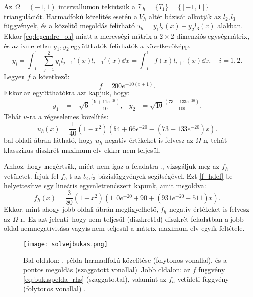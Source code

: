 \begin{example}\label{bukaspelda}
	Az $\Omega = (-1,1)$ intervallumon tekintsük a $\mathcal{T}_h = \{T_1\} = \{[-1,1]\}$ triangulációt. Harmadfokú közelítés esetén a $V_h$ altér bázisát alkotják az $l_2, l_3$ függvények, és a közelítő megoldás felírható $u_h = y_1 l_2(x) + y_2 l_3(x)$ alakban. Ekkor \eqref{eq:legendre_on} miatt a merevségi mátrix a $2 \times 2$ dimenziós egységmátrix, és az ismeretlen $y_1, y_2$ együtthatók felírhatók a következőképp:
	\begin{equation}
		y_i = \int_{-1}^1 \sum_{j=1}^2 y_i l_{j+1}'(x) l_{i+1}'(x) \dd x = \int_{-1}^1 f(x) l_{i+1}(x) \dd x, \quad i = 1,2.
	\end{equation}
	Legyen $f$ a következő: 
	\begin{equation}\label{eq:bukaspelda_rhs}
		f = 200 e^{-10(x+1)}.
	\end{equation}
	Ekkor az együtthatókra azt kapjuk, hogy:
	\begin{align*}
		y_1 & = -\sqrt{6}\frac{(9 + 11 e^{-20})}{10}, & y_2 & = \sqrt{10}\frac{(73 - 133 e^{-20})}{100}. 
	\end{align*}
	Tehát $u$-ra a végeselemes közelítés:
	\begin{equation}
		u_h(x) = \frac{1}{40} (1-x^2) (54 + 66 e^{-20} - (73 - 133 e^{-20})x). 
	\end{equation}
	 bal oldali ábrán látható, hogy $u_h$ negatív értékeket is felvesz az $\Omega$-n, tehát . klasszikus diszkrét maximum-elv ekkor nem teljesül.
	
	 Ahhoz, hogy megértsük, miért nem igaz a feladatra ., vizsgáljuk meg az $f_h$ vetületet. Írjuk fel $f_h$-t az $l_2,l_3$ bázisfüggvények segítségével. Ezt \eqref{f_hdef}-be helyettesítve egy lineáris egyenletrendszert kapunk, amit megoldva:
	\begin{equation}
		f_h(x) = \frac{3}{80} (1-x^2) (110 e^{-20} + 90 + ( 931 e^{-20} - 511)x). 
	\end{equation}
	Ekkor, mint ahogy   jobb oldali ábrán megfigyelhető, $f_h$ negatív értékeket is felvesz az $\Omega$-n. Ez azt jelenti, hogy nem teljesül \aref({diszkret1d}) diszkrét feladatban a jobb oldal nemnegativitása vagyis nem teljesül a mátrix maximum-elv egyik feltétele.		
\end{example}

\begin{figure}[h]
	\centerline{\texttt{[image: solvejbukas.png]}}
	\caption{Bal oldalon: . példa harmadfokú közelítése (folytonos vonallal), és a pontos megoldás (szaggatott vonallal). Jobb oldalon: az $f$ függvény \eqref{eq:bukaspelda_rhs} (szaggatottal), valamint az $f_h$ vetületi függvény (folytonos vonallal) \cite{sol-vej}. }
	\label{fig:solvejbukas}
\end{figure}

